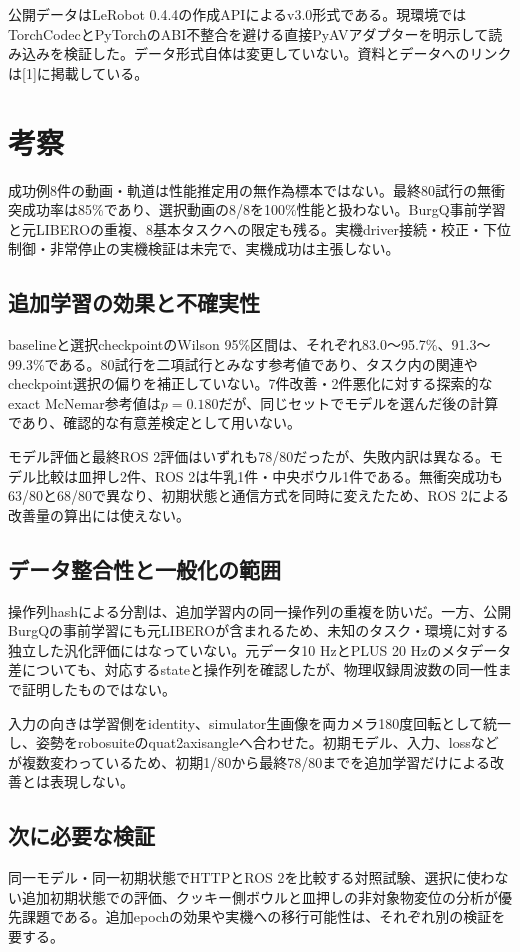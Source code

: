 \documentclass[paper=a4,fontsize=10pt,baselineskip=15pt]{jlreq}
\begin{document}
公開データはLeRobot 0.4.4の作成APIによるv3.0形式である。現環境ではTorchCodecとPyTorchのABI不整合を避ける直接PyAVアダプターを明示して読み込みを検証した。データ形式自体は変更していない。資料とデータへのリンクは[1]に掲載している。
\newpage
\section{考察}
成功例8件の動画・軌道は性能推定用の無作為標本ではない。最終80試行の無衝突成功率は85\%であり、選択動画の8/8を100\%性能と扱わない。BurgQ事前学習と元LIBEROの重複、8基本タスクへの限定も残る。実機driver接続・校正・下位制御・非常停止の実機検証は未完で、実機成功は主張しない。
\subsection{追加学習の効果と不確実性}
baselineと選択checkpointのWilson 95\%区間は、それぞれ83.0〜95.7\%、91.3〜99.3\%である。80試行を二項試行とみなす参考値であり、タスク内の関連やcheckpoint選択の偏りを補正していない。7件改善・2件悪化に対する探索的なexact McNemar参考値は$p=0.180$だが、同じセットでモデルを選んだ後の計算であり、確認的な有意差検定として用いない。

モデル評価と最終ROS 2評価はいずれも78/80だったが、失敗内訳は異なる。モデル比較は皿押し2件、ROS 2は牛乳1件・中央ボウル1件である。無衝突成功も63/80と68/80で異なり、初期状態と通信方式を同時に変えたため、ROS 2による改善量の算出には使えない。
\subsection{データ整合性と一般化の範囲}
操作列hashによる分割は、追加学習内の同一操作列の重複を防いだ。一方、公開BurgQの事前学習にも元LIBEROが含まれるため、未知のタスク・環境に対する独立した汎化評価にはなっていない。元データ10 HzとPLUS 20 Hzのメタデータ差についても、対応するstateと操作列を確認したが、物理収録周波数の同一性まで証明したものではない。

入力の向きは学習側をidentity、simulator生画像を両カメラ180度回転として統一し、姿勢をrobosuiteのquat2axisangleへ合わせた。初期モデル、入力、lossなどが複数変わっているため、初期1/80から最終78/80までを追加学習だけによる改善とは表現しない。
\subsection{次に必要な検証}
同一モデル・同一初期状態でHTTPとROS 2を比較する対照試験、選択に使わない追加初期状態での評価、クッキー側ボウルと皿押しの非対象物変位の分析が優先課題である。追加epochの効果や実機への移行可能性は、それぞれ別の検証を要する。
\end{document}
